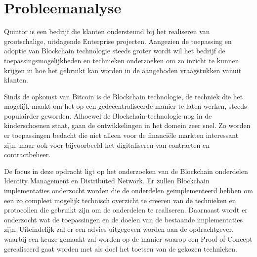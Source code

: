 \chapter{Probleemanalyse}

Quintor is een bedrijf die klanten ondersteund bij het realiseren van grootschalige, uitdagende Enterprise projecten. Aangezien de toepassing en adoptie van Blockchain technologie steeds groter wordt wil het bedrijf de toepassingsmogelijkheden en technieken onderzoeken om zo inzicht te kunnen krijgen in hoe het gebruikt kan worden in de aangeboden vraagstukken vanuit klanten. 

Sinds de opkomst van Bitcoin is de Blockchain technologie, de techniek die het mogelijk maakt om het op een gedecentraliseerde manier te laten werken, steeds populairder geworden. Alhoewel de Blockchain-technologie nog in de kinderschoenen staat, gaan de ontwikkelingen in het domein zeer snel. Zo worden er toepassingen bedacht die niet alleen voor de financiële markten interessant zijn, maar ook voor bijvoorbeeld het digitaliseren van contracten en contractbeheer.

De focus in deze opdracht ligt op het onderzoeken van de Blockchain onderdelen Identity Management en Distributed Network. Er zullen Blockchain implementaties onderzocht worden die de onderdelen geïmplementeerd hebben om een zo compleet mogelijk technisch overzicht te creëren van de technieken en protocollen die gebruikt zijn om de onderdelen te realiseren. Daarnaast wordt er onderzocht wat de toepassingen en de doelen van de bestaande implementaties zijn. Uiteindelijk zal er een advies uitgegeven worden aan de opdrachtgever, waarbij een keuze gemaakt zal worden op de manier waarop een Proof-of-Concept gerealiseerd gaat worden met als doel het toetsen van de gekozen technieken.
